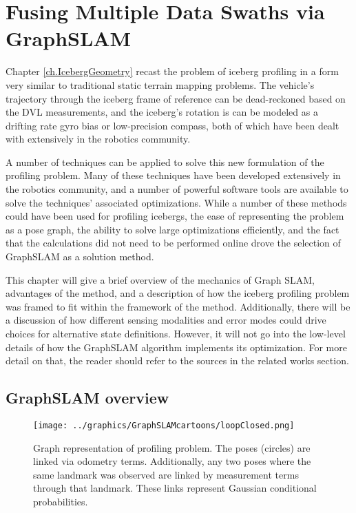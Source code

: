 
\chapter{Fusing Multiple Data Swaths via GraphSLAM}
\label{ch.GraphSLAM}

Chapter \ref{ch.IcebergGeometry} recast the problem of iceberg profiling in a form very similar to traditional static terrain mapping problems. The vehicle's trajectory through the iceberg frame of reference can be dead-reckoned based on the DVL measurements, and the iceberg's rotation is can be modeled as a drifting rate gyro bias or low-precision compass, both of which have been dealt with extensively in the robotics community.

A number of techniques can be applied to solve this new formulation of the profiling problem. Many of these techniques have been developed extensively in the robotics community, and a number of powerful software tools are available to solve the techniques' associated optimizations. While a number of these methods could have been used for profiling icebergs, the ease of representing the problem as a pose graph, the ability to solve large optimizations efficiently, and the fact that the calculations did not need to be performed online drove the selection of GraphSLAM as a solution method. 

This chapter will give a brief overview of the mechanics of Graph SLAM, advantages of the method, and a description of how the iceberg profiling problem was framed to fit within the framework of the method. Additionally, there will be a discussion of how different sensing modalities and error modes could drive choices for alternative state definitions. However, it will not go into the low-level details of how the GraphSLAM algorithm implements its optimization. For more detail on that, the reader should refer to the sources in the related works section.

\section{GraphSLAM overview}

\begin{figure}[htb]
   \centering
   \texttt{[image: ../graphics/GraphSLAMcartoons/loopClosed.png]} %
   \caption{Graph representation of profiling problem.  The poses (circles) are linked via odometry terms. Additionally, any two poses where the same landmark was observed are linked by measurement terms through that landmark. These links represent Gaussian conditional probabilities. }
   \label{fig:GraphSLAM}
\end{figure}

